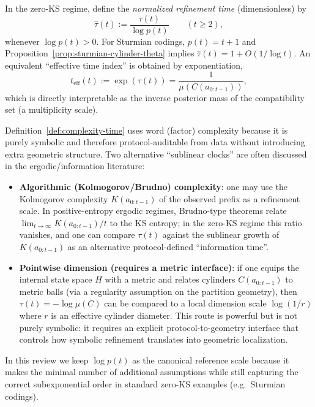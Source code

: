 \begin{definition}\label{def:zero-ks-normalized-time}
In the zero-KS regime, define the \emph{normalized refinement time} (dimensionless) by
\[
\widehat{\tau}(t):=\frac{\tau(t)}{\log p(t)}\qquad (t\ge 2),
\]
whenever $\log p(t)>0$.
For Sturmian codings, $p(t)=t+1$ and Proposition~\ref{prop:sturmian-cylinder-theta} implies $\widehat{\tau}(t)=1+O(1/\log t)$.
An equivalent ``effective time index'' is obtained by exponentiation,
\[
t_{\mathrm{eff}}(t):=\exp(\tau(t))=\frac{1}{\mu(C(a_{0:t-1}))},
\]
which is directly interpretable as the inverse posterior mass of the compatibility set (a multiplicity scale).
\end{definition}

\begin{remark}\label{rem:zero-ks-alternatives}
Definition~\ref{def:complexity-time} uses word (factor) complexity because it is purely symbolic and therefore protocol-auditable from data without introducing extra geometric structure. Two alternative ``sublinear clocks'' are often discussed in the ergodic/information literature:
\begin{itemize}[leftmargin=*,itemsep=2pt]
  \item \textbf{Algorithmic (Kolmogorov/Brudno) complexity}: one may use the Kolmogorov complexity $K(a_{0:t-1})$ of the observed prefix as a refinement scale. In positive-entropy ergodic regimes, Brudno-type theorems relate $\lim_{t\to\infty}K(a_{0:t-1})/t$ to the KS entropy; in the zero-KS regime this ratio vanishes, and one can compare $\tau(t)$ against the sublinear growth of $K(a_{0:t-1})$ as an alternative protocol-defined ``information time''.
  \item \textbf{Pointwise dimension (requires a metric interface)}: if one equips the internal state space $H$ with a metric and relates cylinders $C(a_{0:t-1})$ to metric balls (via a regularity assumption on the partition geometry), then $\tau(t)=-\log\mu(C)$ can be compared to a local dimension scale $\log(1/r)$ where $r$ is an effective cylinder diameter. This route is powerful but is not purely symbolic: it requires an explicit protocol-to-geometry interface that controls how symbolic refinement translates into geometric localization.
\end{itemize}
In this review we keep $\log p(t)$ as the canonical reference scale because it makes the minimal number of additional assumptions while still capturing the correct subexponential order in standard zero-KS examples (e.g.\ Sturmian codings).
\end{remark}

